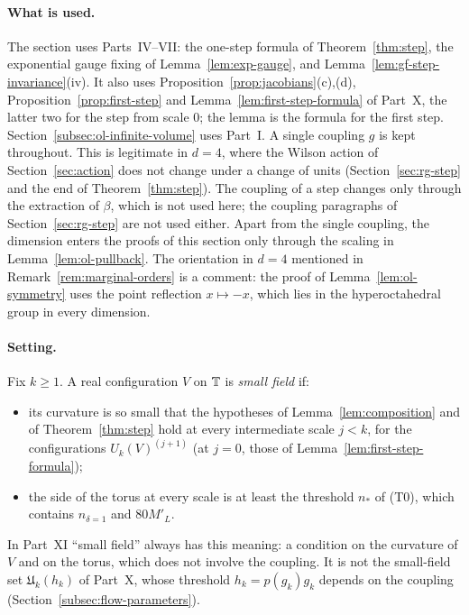 \paragraph{What is used.} The section uses Parts~IV--VII: the one-step formula of Theorem~\ref{thm:step}, the exponential gauge fixing of Lemma~\ref{lem:exp-gauge}, and Lemma~\ref{lem:gf-step-invariance}(iv). It also uses Proposition~\ref{prop:jacobians}(c),(d), Proposition~\ref{prop:first-step} and Lemma~\ref{lem:first-step-formula} of Part~X, the latter two for the step from scale $0$; the lemma is the formula for the first step. Section~\ref{subsec:ol-infinite-volume} uses Part~I. A single coupling $g$ is kept throughout. This is legitimate in $d=4$, where the Wilson action of Section~\ref{sec:action} does not change under a change of units (Section~\ref{sec:rg-step} and the end of Theorem~\ref{thm:step}). The coupling of a step changes only through the extraction of $\beta$, which is not used here; the coupling paragraphs of Section~\ref{sec:rg-step} are not used either. Apart from the single coupling, the dimension enters the proofs of this section only through the scaling in Lemma~\ref{lem:ol-pullback}. The orientation in $d=4$ mentioned in Remark~\ref{rem:marginal-orders} is a comment: the proof of Lemma~\ref{lem:ol-symmetry} uses the point reflection $x\mapsto-x$, which lies in the hyperoctahedral group in every dimension.

\paragraph{Setting.} Fix $k\ge1$. A real configuration $V$ on $\mathbb T$ is \emph{small field} if:
\begin{itemize}
\item its curvature is so small that the hypotheses of Lemma~\ref{lem:composition} and of Theorem~\ref{thm:step} hold at every intermediate scale $j<k$, for the configurations $U_k(V)^{(j+1)}$ (at $j=0$, those of Lemma~\ref{lem:first-step-formula});
\item the side of the torus at every scale is at least the threshold $n_*$ of (T0), which contains $n_{\delta=1}$ and $80M'_L$.
\end{itemize}
In Part~XI ``small field'' always has this meaning: a condition on the curvature of $V$ and on the torus, which does not involve the coupling. It is not the small-field set $\mathfrak U_k(h_k)$ of Part~X, whose threshold $h_k=p(g_k)g_k$ depends on the coupling (Section~\ref{subsec:flow-parameters}).

